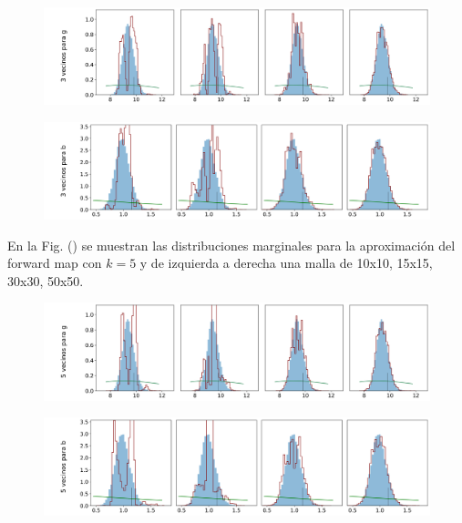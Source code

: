 \begin{figure}[H] 
    \centering 
    \includegraphics[width = 16 cm ]{img/Exp_Central_gravedad_Sigma/Figuras/Generales/Convergencia_theta1_1_gravedad_sigma.png} 
\end{figure} 

\begin{figure}[H] 
    \centering 
    \includegraphics[width = 16 cm ]{img/Exp_Central_gravedad_Sigma/Figuras/Generales/Convergencia_theta2_1_gravedad_sigma.png} 
\end{figure} 

En la Fig. () se muestran las distribuciones marginales para la aproximación del forward map con $k = 5$ y de izquierda a derecha una malla de 10x10, 15x15, 30x30, 50x50.

\begin{figure}[H] 
    \centering 
    \includegraphics[width = 16 cm ]{img/Exp_Central_gravedad_Sigma/Figuras/Generales/Convergencia_theta1_2_gravedad_sigma.png} 
\end{figure} 

\begin{figure}[H] 
    \centering 
    \includegraphics[width = 16 cm ]{img/Exp_Central_gravedad_Sigma/Figuras/Generales/Convergencia_theta2_2_gravedad_sigma.png} 
\end{figure} 

